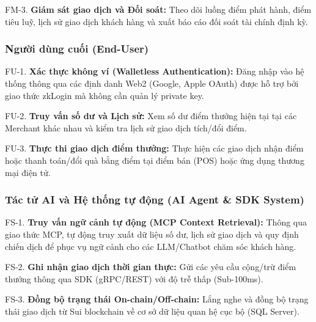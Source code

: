 FM-3. \textbf{Giám sát giao dịch và Đối soát:} Theo dõi luồng điểm phát hành, điểm tiêu luỹ, lịch sử giao dịch khách hàng và xuất báo cáo đối soát tài chính định kỳ.

\subsubsection{Người dùng cuối (End-User)}
FU-1. \textbf{Xác thực không ví (Walletless Authentication):} Đăng nhập vào hệ thống thông qua các định danh Web2 (Google, Apple OAuth) được hỗ trợ bởi giao thức zkLogin mà không cần quản lý private key.

FU-2. \textbf{Truy vấn số dư và Lịch sử:} Xem số dư điểm thưởng hiện tại tại các Merchant khác nhau và kiểm tra lịch sử giao dịch tích/đổi điểm.

FU-3. \textbf{Thực thi giao dịch điểm thưởng:} Thực hiện các giao dịch nhận điểm hoặc thanh toán/đổi quà bằng điểm tại điểm bán (POS) hoặc ứng dụng thương mại điện tử.

\subsubsection{Tác tử AI và Hệ thống tự động (AI Agent \& SDK System)}
FS-1. \textbf{Truy vấn ngữ cảnh tự động (MCP Context Retrieval):} Thông qua giao thức MCP, tự động truy xuất dữ liệu số dư, lịch sử giao dịch và quy định chiến dịch để phục vụ ngữ cảnh cho các LLM/Chatbot chăm sóc khách hàng.

FS-2. \textbf{Ghi nhận giao dịch thời gian thực:} Gửi các yêu cầu cộng/trừ điểm thưởng thông qua SDK (gRPC/REST) với độ trễ thấp (Sub-100ms).

FS-3. \textbf{Đồng bộ trạng thái On-chain/Off-chain:} Lắng nghe và đồng bộ trạng thái giao dịch từ Sui blockchain về cơ sở dữ liệu quan hệ cục bộ (SQL Server).

